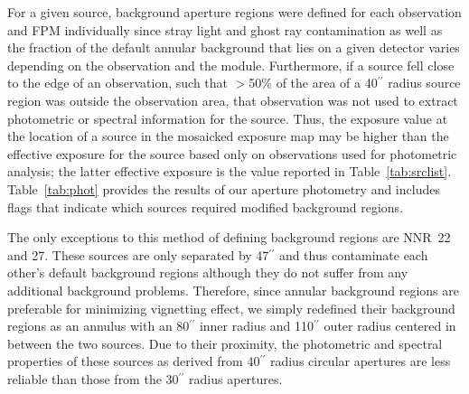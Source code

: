 \documentclass[iop,revtex4]{emulateapj}
\begin{document}
For a given source, background aperture regions were defined for each observation and FPM individually since stray light and ghost ray contamination as well as the fraction of the default annular background that lies on a given detector varies depending on the observation and the module.  Furthermore, if a source fell close to the edge of an observation, such that $>$50\% of the area of a 40$^{\prime\prime}$ radius source region was outside the observation area, that observation was not used to extract photometric or spectral information for the source.  Thus, the exposure value at the location of a source in the mosaicked exposure map may be higher than the effective exposure for the source based only on observations used for photometric analysis; the latter effective exposure is the value reported in Table~\ref{tab:srclist}.  Table~\ref{tab:phot} provides the results of our aperture photometry and includes flags that indicate which sources required modified background regions.  \par
The only exceptions to this method of defining background regions are NNR~22 and 27.  These sources are only separated by 47$^{\prime\prime}$ and thus contaminate each other's default background regions although they do not suffer from any additional background problems.  Therefore, since annular background regions are preferable for minimizing vignetting effect, we simply redefined their background regions as an annulus with an 80$^{\prime\prime}$ inner radius and 110$^{\prime\prime}$ outer radius centered in between the two sources.  Due to their proximity, the photometric and spectral properties of these sources as derived from 40$^{\prime\prime}$ radius circular apertures are less reliable than those from the 30$^{\prime\prime}$ radius apertures. 
\end{document}
